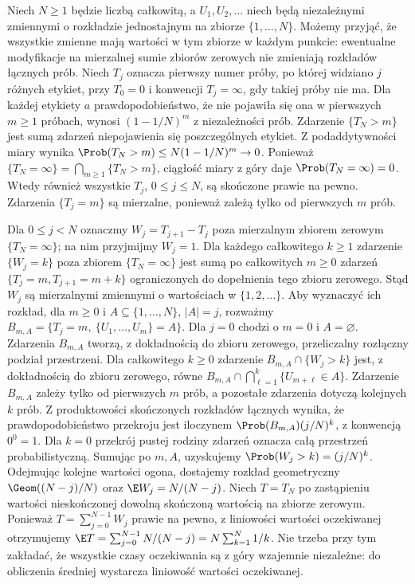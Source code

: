 \begin{przyklad}
Niech $N\geq1$ będzie liczbą całkowitą, a $U_1,U_2,\ldots$
niech będą niezależnymi zmiennymi o rozkładzie jednostajnym
na zbiorze $\{1,\ldots,N\}$. Możemy przyjąć, że wszystkie
zmienne mają wartości w tym zbiorze w każdym punkcie:
ewentualne modyfikacje na mierzalnej sumie zbiorów
zerowych nie zmieniają rozkładów łącznych prób.
Niech $T_j$ oznacza pierwszy numer próby, po której
widziano $j$ różnych etykiet,
przy $T_0=0$ i konwencji $T_j=\infty$, gdy takiej próby nie ma.
Dla każdej etykiety $a$ prawdopodobieństwo, że nie pojawiła
się ona w pierwszych $m\geq1$ próbach, wynosi $(1-1/N)^m$
z niezależności prób. Zdarzenie $\{T_N>m\}$ jest sumą
zdarzeń niepojawienia się poszczególnych etykiet.
Z podaddytywności miary wynika
$\Prob(T_N>m)\leq N(1-1/N)^m\to0$.
Ponieważ $\{T_N=\infty\}=\bigcap_{m\geq1}\{T_N>m\}$,
ciągłość miary z góry daje $\Prob(T_N=\infty)=0$.
Wtedy również wszystkie $T_j$, $0\leq j\leq N$,
są skończone prawie na pewno.
Zdarzenia $\{T_j=m\}$ są mierzalne, ponieważ zależą tylko
od pierwszych $m$ prób.

Dla $0\leq j<N$ oznaczmy $W_j=T_{j+1}-T_j$ poza
mierzalnym zbiorem zerowym $\{T_N=\infty\}$; na nim
przyjmijmy $W_j=1$. Dla każdego całkowitego $k\geq1$
zdarzenie $\{W_j=k\}$ poza zbiorem $\{T_N=\infty\}$
jest sumą po całkowitych $m\geq0$ zdarzeń
$\{T_j=m,T_{j+1}=m+k\}$ ograniczonych do dopełnienia
tego zbioru zerowego. Stąd $W_j$ są mierzalnymi
zmiennymi o wartościach w $\{1,2,\ldots\}$.
Aby wyznaczyć ich rozkład, dla $m\geq0$ i
$A\subseteq\{1,\ldots,N\}$, $|A|=j$, rozważmy
$B_{m,A}=\{T_j=m,\ \{U_1,\ldots,U_m\}=A\}$.
Dla $j=0$ chodzi o $m=0$ i $A=\varnothing$.
Zdarzenia $B_{m,A}$ tworzą, z dokładnością do zbioru
zerowego, przeliczalny rozłączny podział przestrzeni.
Dla całkowitego $k\geq0$ zdarzenie
$B_{m,A}\cap\{W_j>k\}$ jest, z dokładnością do zbioru
zerowego, równe
$B_{m,A}\cap\bigcap_{\ell=1}^k\{U_{m+\ell}\in A\}$.
Zdarzenie $B_{m,A}$ zależy tylko od pierwszych $m$ prób,
a pozostałe zdarzenia dotyczą kolejnych $k$ prób.
Z produktowości skończonych rozkładów łącznych wynika,
że prawdopodobieństwo przekroju jest iloczynem
$\Prob(B_{m,A})(j/N)^k$, z konwencją $0^0=1$.
Dla $k=0$ przekrój pustej rodziny zdarzeń oznacza
całą przestrzeń probabilistyczną.
Sumując po $m,A$, uzyskujemy
$\Prob(W_j>k)=(j/N)^k$.
Odejmując kolejne wartości ogona, dostajemy rozkład
geometryczny $\Geom((N-j)/N)$ oraz
$\E W_j=N/(N-j)$.
Niech $T=T_N$ po zastąpieniu wartości nieskończonej
dowolną skończoną wartością na zbiorze zerowym.
Ponieważ $T=\sum_{j=0}^{N-1}W_j$ prawie na pewno,
z liniowości wartości oczekiwanej otrzymujemy
$\E T=\sum_{j=0}^{N-1}N/(N-j)=N\sum_{k=1}^N1/k$.
Nie trzeba przy tym zakładać, że wszystkie czasy oczekiwania
są z góry wzajemnie niezależne: do obliczenia średniej
wystarcza liniowość wartości oczekiwanej.
\end{przyklad}

